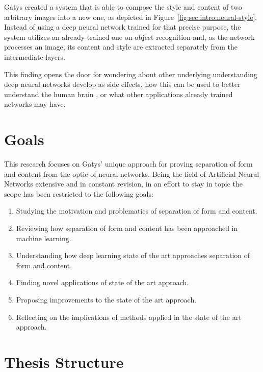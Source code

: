 Gatys created a system that is able to compose the style and content of two arbitrary images into a new one, as depicted in Figure~\ref{fig:sec:intro:neural-style}.
Instead of using a deep neural network trained for that precise purpose, the system utilizes an already trained one on object recognition and, as the network processes an image, its content and style are extracted separately from the intermediate layers.

This finding opens the door for wondering about other underlying understanding deep neural networks develop as side effects, how this can be used to better understand the human brain \cite{Yamins2016}, or what other applications already trained networks may have.



\section{Goals}
\label{sec:intro:goals}

This research focuses on Gatys' unique approach for proving separation of form and content from the optic of neural networks.
Being the field of Artificial Neural Networks extensive and in constant revision, in an effort to stay in topic the scope has been restricted to the following goals:

\begin{enumerate}
  \item Studying the motivation and problematics of separation of form and content.
  \item Reviewing how separation of form and content has been approached in machine learning.
  \item Understanding how deep learning state of the art approaches separation of form and content.
  \item Finding novel applications of state of the art approach.
  \item Proposing improvements to the state of the art approach.
  \item Reflecting on the implications of methods applied in the state of the art approach.
\end{enumerate}



\section{Thesis Structure}
\label{sec:intro:structure}

